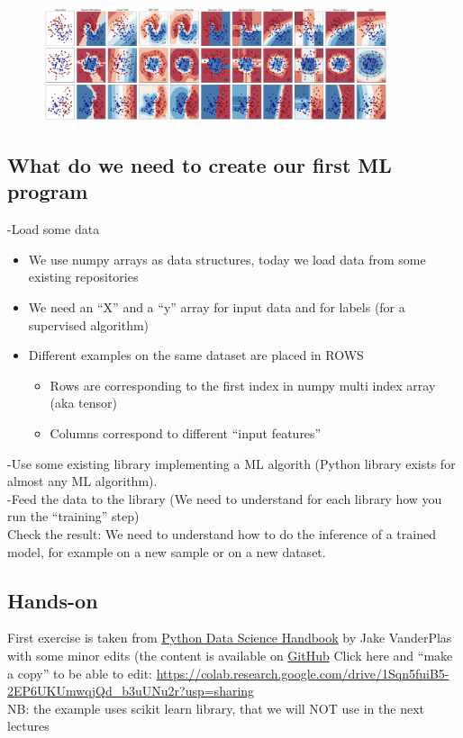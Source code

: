 \begin{figure}[ht]
	\centering
	\includegraphics[width=0.9\textwidth]{figure_ml/scikit.png}
\end{figure}
\FloatBarrier

\subsection{What do we need to create our first ML program}

-Load some data
\begin{itemize}
	\item We use numpy arrays as data structures, today we load data from some existing repositories
	\item We need an “X” and a “y” array for input data and for labels (for a supervised algorithm)
	\item Different examples on the same dataset are placed in ROWS
	\begin{itemize}
		\item Rows are corresponding to the first index in numpy multi index array (aka tensor)
		\item Columns correspond to different “input features”
	\end{itemize}
\end{itemize}

-Use some existing library implementing a ML algorith (Python library exists for almost any ML algorithm).\\

-Feed the data to the library (We need to understand for each library how you run the “training” step)\\

Check the result: We need to understand how to do the inference of a trained model, for example on a new sample or on a new dataset.

\subsection{Hands-on}


First exercise is taken from \href{http://shop.oreilly.com/product/0636920034919.do}{Python Data Science Handbook} by Jake
VanderPlas with some minor edits (the content is available on \href{https://github.com/jakevdp/PythonDataScienceHandbook}{GitHub} 
Click here and “make a copy” to be able to edit: \url{https://colab.research.google.com/drive/1Sqn5fuiB5-2EP6UKUmwqjQd_b3uUNu2r?usp=sharing}\\
NB: the example uses scikit learn library, that we will NOT use in the next lectures

